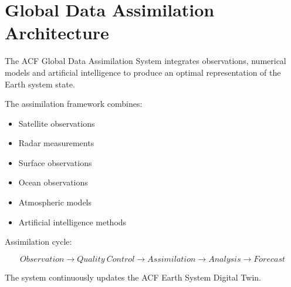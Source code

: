 \section{Global Data Assimilation Architecture}


The ACF Global Data Assimilation System integrates observations,
numerical models and artificial intelligence to produce an optimal
representation of the Earth system state.



The assimilation framework combines:


\begin{itemize}

\item Satellite observations

\item Radar measurements

\item Surface observations

\item Ocean observations

\item Atmospheric models

\item Artificial intelligence methods

\end{itemize}



Assimilation cycle:


\[
Observation
\rightarrow
Quality\ Control
\rightarrow
Assimilation
\rightarrow
Analysis
\rightarrow
Forecast
\]



The system continuously updates the ACF Earth System Digital Twin.
